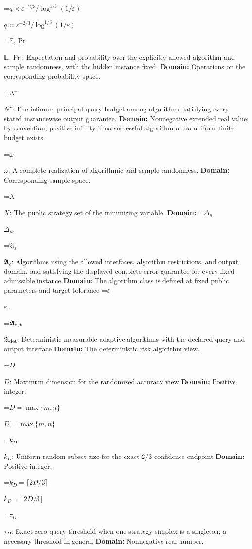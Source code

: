\documentclass[10pt,a4paper]{article}
\newcommand{\AtlasMath}[1]{\par\begingroup\centering\setbox0=\hbox{$\displaystyle #1$}\ifdim\wd0>1.4\linewidth\typeout{ATLAS WIDE FORMULA: \the\wd0}\fi\ifdim\wd0>\linewidth\resizebox{\linewidth}{!}{\box0}\else\box0\fi\par\endgroup}
\newcommand{\AtlasInlineMath}[1]{\begingroup\setbox0=\hbox{$#1$}\ifdim\wd0>.4\linewidth\endgroup\AtlasMath{#1}\else\endgroup$#1$\fi}
\begin{document}
\AtlasInlineMath{q\asymp\varepsilon^{-2/3}/\log^{1/3}(1/\varepsilon)}



\AtlasInlineMath{\mathbb E,\Pr}: Expectation and probability over the explicitly allowed algorithm and sample randomness, with the hidden instance fixed. \textbf{Domain:} Operations on the corresponding probability space.



\AtlasInlineMath{N^\star}: The infimum principal query budget among algorithms satisfying every stated instancewise output guarantee. \textbf{Domain:} Nonnegative extended real value; by convention, positive infinity if no successful algorithm or no uniform finite budget exists.



\AtlasInlineMath{\omega}: A complete realization of algorithmic and sample randomness. \textbf{Domain:} Corresponding sample space.



\AtlasInlineMath{X}: The public strategy set of the minimizing variable. \textbf{Domain:} \AtlasInlineMath{\Delta_n}.



\AtlasInlineMath{\mathfrak A_\varepsilon}: Algorithms using the allowed interfaces, algorithm restrictions, and output domain, and satisfying the displayed complete error guarantee for every fixed admissible instance \textbf{Domain:} The algorithm class is defined at fixed public parameters and target tolerance \AtlasInlineMath{\varepsilon}.



\AtlasInlineMath{\mathfrak A_{\rm det}}: Deterministic measurable adaptive algorithms with the declared query and output interface \textbf{Domain:} The deterministic risk algorithm view.



\AtlasInlineMath{D}: Maximum dimension for the randomized accuracy view \textbf{Domain:} Positive integer.



\AtlasInlineMath{D=\max\{m,n\}}



\AtlasInlineMath{k_D}: Uniform random subset size for the exact 2/3-confidence endpoint \textbf{Domain:} Positive integer.



\AtlasInlineMath{k_D=\lceil2D/3\rceil}



\AtlasInlineMath{\tau_D}: Exact zero-query threshold when one strategy simplex is a singleton; a necessary threshold in general \textbf{Domain:} Nonnegative real number.
\end{document}
